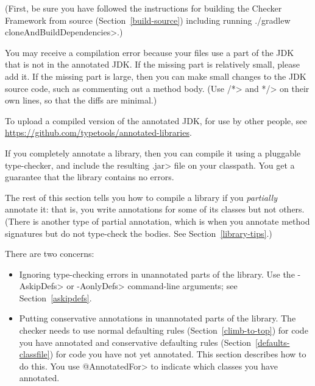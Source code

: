 \begin{enumerate}
(First, be sure you have followed the instructions for building the Checker
Framework from source (Section~\ref{build-source})
including running \<./gradlew cloneAndBuildDependencies>.)

You may receive a compilation error because your files use a part of the
JDK that is not in the annotated JDK\@.  If the missing part is relatively
small, please add it.  If the missing part is large, then you can make
small changes to the JDK source code, such as commenting out a method body.
(Use \</*> and \<*/> on their own lines, so that the diffs are minimal.)

To upload a compiled version of the annotated JDK, for use by other people,
see \url{https://github.com/typetools/annotated-libraries}.

\end{enumerate}



If you completely annotate a library, then you can compile it using a
pluggable type-checker, and include the resulting \<.jar> file on your
classpath.  You get a guarantee that the library contains no errors.

The rest of this section tells you how to compile a library if you
\emph{partially} annotate it:  that is, you write annotations for some of its
classes but not others.
(There is another type of partial annotation, which is when you annotate
method signatures but do not type-check the bodies.
See Section~\ref{library-tips}.)

There are two concerns:

\begin{itemize}
\item
  Ignoring type-checking errors in unannotated parts of the library.
  Use the \<-AskipDefs> or \<-AonlyDefs> command-line arguments; see
  Section~\ref{askipdefs}.

\item
  Putting conservative annotations in unannotated parts of the library.
  The checker needs to use normal defaulting rules
  (Section~\ref{climb-to-top}) for code you have annotated and conservative
  defaulting rules (Section~\ref{defaults-classfile}) for code you have not
  yet annotated.  This section describes how to do this.  You use
  \<@AnnotatedFor> to indicate which classes you have annotated.
\end{itemize}



